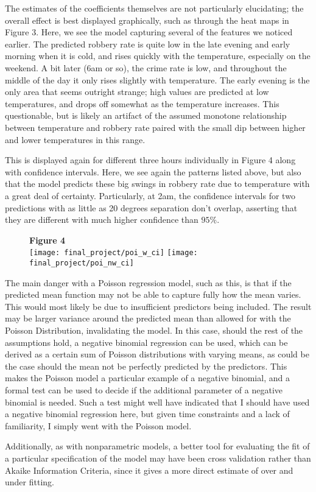 \documentclass[11pt]{article}
\theoremstyle{definition}
\begin{document}
The estimates of the coefficients themselves are not particularly elucidating; the overall effect is best displayed graphically, such as through the heat maps in Figure 3. Here, we see the model capturing several of the features we noticed earlier. The predicted robbery rate is quite low in the late evening and early morning when it is cold, and rises quickly with the temperature, especially on the weekend. A bit later (6am or so), the crime rate is low, and throughout the middle of the day it only rises slightly with temperature. The early evening is the only area that seems outright strange; high values are predicted at low temperatures, and drops off somewhat as the temperature increases. This questionable, but is likely an artifact of the assumed monotone relationship between temperature and robbery rate paired with the small dip between higher and lower temperatures in this range. \par
This is displayed again for different three hours individually in Figure 4 along with confidence intervals. Here, we see again the patterns listed above, but also that the model predicts these big swings in robbery rate due to temperature with a great deal of certainty. Particularly, at 2am, the confidence intervals for two predictions with as little as 20 degrees separation don't overlap, asserting that they are different with much higher confidence than $95\%$. \par

\begin{figure}[h]
    {\bf Figure 4} \\
    \texttt{[image: final\_project/poi\_w\_ci]}
    \texttt{[image: final\_project/poi\_nw\_ci]}
\end{figure}

The main danger with a Poisson regression model, such as this, is that if the predicted mean function may not be able to capture fully how the mean varies. This would most likely be due to insufficient predictors being included. The result may be larger variance around the predicted mean than allowed for with the Poisson Distribution, invalidating the model. In this case, should the rest of the assumptions hold, a negative binomial regression can be used, which can be derived as a certain sum of Poisson distributions with varying means, as could be the case should the mean not be perfectly predicted by the predictors. This makes the Poisson model a particular example of a negative binomial, and a formal test can be used to decide if the additional parameter of a negative binomial is needed. Such a test might well have indicated that I should have used a negative binomial regression here, but given time constraints and a lack of familiarity, I simply went with the Poisson model. \par
Additionally, as with nonparametric models, a better tool for evaluating the fit of a particular specification of the model may have been cross validation rather than Akaike Information Criteria, since it gives a more direct estimate of over and under fitting. 
\end{document}
